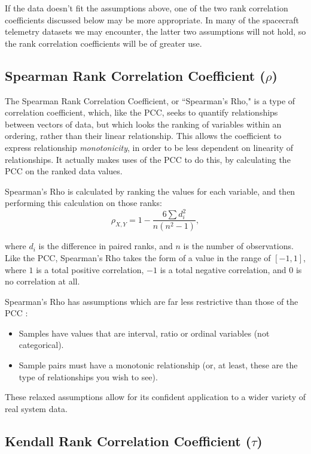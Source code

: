 If the data doesn't fit the assumptions above, one of the two rank correlation coefficients discussed below may be more appropriate. In many of the spacecraft telemetry datasets we may encounter, the latter two assumptions will not hold, so the rank correlation coefficients will be of greater use.

\subsection{Spearman Rank Correlation Coefficient ($\rho$)}

The Spearman Rank Correlation Coefficient, or ``Spearman's Rho," is a type of correlation coefficient, which, like the PCC, seeks to quantify relationships between vectors of data, but which looks the ranking of variables within an ordering, rather than their linear relationship. This allows the coefficient to express relationship \textit{monotonicity}, in order to be less dependent on linearity of relationships. It actually makes uses of the PCC to do this, by calculating the PCC on the ranked data values.

Spearman's Rho is calculated by ranking the values for each variable, and then performing this calculation on those ranks:
\begin{equation} \label{eq:rho}
\rho_{X, Y} = 1 - \frac{6 \sum{d_{i}^{2}}}{n(n^{2}-1)},
\end{equation}

where $d_{i}$ is the difference in paired ranks, and $n$ is the number of observations. Like the PCC, Spearman's Rho takes the form of a value in the range of $[-1, 1]$, where $1$ is a total positive correlation, $-1$ is a total negative correlation, and $0$ is no correlation at all.

Spearman's Rho has assumptions which are far less restrictive than those of the PCC \cite{spearmans}:

\begin{itemize}
\item Samples have values that are interval, ratio or ordinal variables (not categorical).
\item Sample pairs must have a monotonic relationship (or, at least, these are the type of relationships you wish to see).
\end{itemize}

These relaxed assumptions allow for its confident application to a wider variety of real system data.

\subsection{Kendall Rank Correlation Coefficient ($\tau$)}

